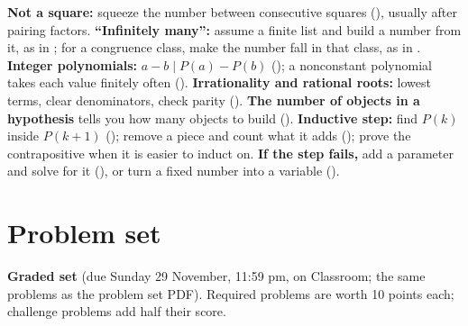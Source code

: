 \documentclass[10pt]{scrartcl}
\begin{document}
\begin{shortcuts}
  \ii \textbf{Not a square:} squeeze the number between consecutive squares (), usually after pairing factors.
  \ii \textbf{``Infinitely many'':} assume a finite list and build a number from it, as in ; for a congruence class, make the number fall in that class, as in .
  \ii \textbf{Integer polynomials:} $a - b \mid P(a) - P(b)$ (); a nonconstant polynomial takes each value finitely often ().
  \ii \textbf{Irrationality and rational roots:} lowest terms, clear denominators, check parity ().
  \ii \textbf{The number of objects in a hypothesis} tells you how many objects to build ().
  \ii \textbf{Inductive step:} find $P(k)$ inside $P(k+1)$ (); remove a piece and count what it adds (); prove the contrapositive when it is easier to induct on.
  \ii \textbf{If the step fails,} add a parameter and solve for it (), or turn a fixed number into a variable ().
\end{shortcuts}

\section{Problem set}

\textbf{Graded set} (due Sunday 29 November, 11:59 pm, on Classroom; the same problems as the problem set PDF). Required problems are worth 10 points each; challenge problems add half their score.
\end{document}
